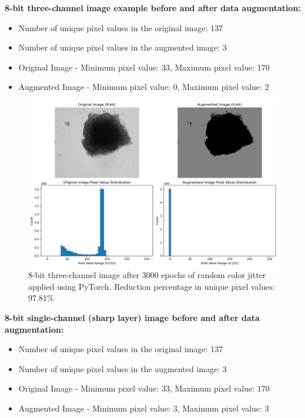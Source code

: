 \textbf{8-bit three-channel image example before and after data augmentation:}
\begin{itemize}
  \item Number of unique pixel values in the original image: 137
  \item Number of unique pixel values in the augmented image: 3
  \item Original Image - Minimum pixel value: 33, Maximum pixel value: 170
  \item Augmented Image - Minimum pixel value: 0, Maximum pixel value: 2
\end{itemize}
\begin{figure}[H]
  \centering
  \includegraphics[scale=0.5]{figures/8bit_nThree.png} 
  \caption{8-bit three-channel image after 3000 epochs of random color jitter applied using PyTorch. Reduction percentage in unique pixel values: 97.81\%}
  \label{fig:8bit_nThree}
\end{figure}

\textbf{8-bit single-channel (sharp layer) image before and after data augmentation:}

\begin{itemize}
  \item Number of unique pixel values in the original image: 137
  \item Number of unique pixel values in the augmented image: 3
  \item Original Image - Minimum pixel value: 33, Maximum pixel value: 170
  \item Augmented Image - Minimum pixel value: 3, Maximum pixel value: 3
\end{itemize}

